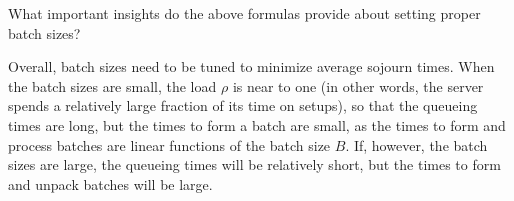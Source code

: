 \begin{exercise}
  What important insights do the above formulas provide about setting proper batch sizes?
\begin{solution}
    Overall, batch sizes need to be tuned to minimize average sojourn times.
    When the batch sizes are small, the load $\rho$ is near to one (in other words, the server spends a relatively large fraction of its time on setups), so that the queueing times are long, but the times to form a batch are small, as the times to form and process batches are linear functions of the batch size $B$.
    If, however, the batch sizes are large, the queueing times will be relatively short, but the times to form and unpack batches will be large.
\end{solution}
\end{exercise}



